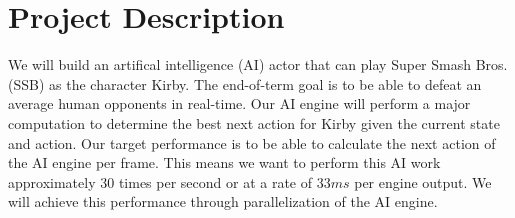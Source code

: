 \chapter*{Project Description}

We will build an artifical intelligence (AI) actor that can play Super Smash Bros. (SSB) as the character Kirby.
The end-of-term goal is to be able to defeat an average human opponents in real-time.
Our AI engine will perform a major computation to determine the best next action for Kirby given the current state and action. 
Our target performance is to be able to calculate the next action of the AI engine per frame. 
This means we want to perform this AI work approximately 30 times per second or at a rate of $33ms$ per engine output.
We will achieve this performance through parallelization of the AI engine.
